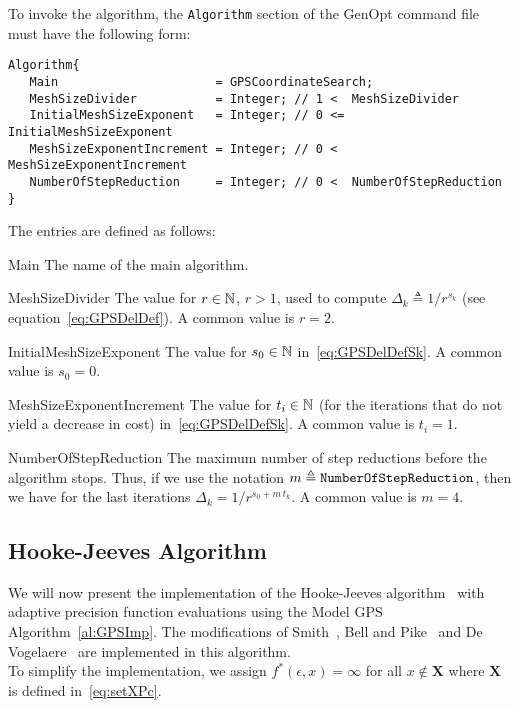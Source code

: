 To invoke the algorithm, 
the \texttt{Algorithm} section of the GenOpt command file must have the following form:
\begin{lstlisting}
Algorithm{
   Main                      = GPSCoordinateSearch;
   MeshSizeDivider           = Integer; // 1 <  MeshSizeDivider
   InitialMeshSizeExponent   = Integer; // 0 <= InitialMeshSizeExponent
   MeshSizeExponentIncrement = Integer; // 0 <  MeshSizeExponentIncrement
   NumberOfStepReduction     = Integer; // 0 <  NumberOfStepReduction
}
\end{lstlisting}
The entries are defined as follows:
\begin{codedescription}
\item [Main]
The name of the main algorithm.
\item [MeshSizeDivider]
The value for $r \in {\mathbb N}$, $r>1$, used to compute 
$\Delta_k \triangleq  {1} / {r^{s_k}}$ (see equation~\eqref{eq:GPSDelDef}).
A common value is $r = 2$.

\item [InitialMeshSizeExponent]
The value for $s_0 \in {\mathbb N}$ in~\eqref{eq:GPSDelDefSk}.
A common value is $s_0 = 0$.

\item [MeshSizeExponentIncrement]
The value for $t_i \in {\mathbb N}$ (for the iterations that do not yield
a decrease in cost) in~\eqref{eq:GPSDelDefSk}.
A common value is $t_i = 1$.

\item [NumberOfStepReduction]
The maximum number of step reductions before the algorithm stops.
Thus, if we use the notation $m \triangleq \text{\texttt{NumberOfStepReduction}}$, then
we have for the last iterations $\Delta_k = {1} / {r^{s_0 + m\, t_k}}$.
A common value is $m = 4$.
\end{codedescription}

\subsection{Hooke-Jeeves Algorithm}
We will now present the implementation of the Hooke-Jeeves algorithm~\cite{HookeJee1961}
with adaptive precision function evaluations
using the Model GPS Algorithm~\ref{al:GPSImp}.
The modifications of Smith~\cite{Smith1969},
Bell and Pike~\cite{BellPik1966} and
De Vogelaere~\cite{DeVogelaere1968}
are implemented in this algorithm.\\

 
To simplify the implementation, we assign
$f^*(\epsilon,x) = \infty$ for all $x \not \in \mathbf X$ where
$\mathbf X$ is defined in~\eqref{eq:setXPc}.

